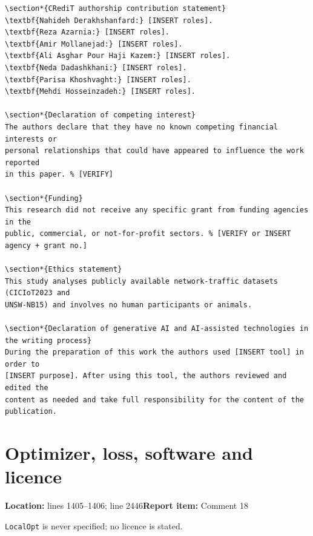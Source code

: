 \documentclass[10pt,a4paper]{article}
\newcommand{\issue}[3]{\section{#1}{\raggedright\noindent\textcolor{note}{\small\textbf{Location:} #2\quad\textbf{Report item:} #3}\par}\smallskip}
\newcommand{\why}[1]{\noindent\textcolor{note}{\small #1}\par\smallskip}
\begin{document}
\begin{after}
\begin{Verbatim}
\section*{CRediT authorship contribution statement}
\textbf{Nahideh Derakhshanfard:} [INSERT roles].
\textbf{Reza Azarnia:} [INSERT roles].
\textbf{Amir Mollanejad:} [INSERT roles].
\textbf{Ali Asghar Pour Haji Kazem:} [INSERT roles].
\textbf{Neda Dadashkhani:} [INSERT roles].
\textbf{Parisa Khoshvaght:} [INSERT roles].
\textbf{Mehdi Hosseinzadeh:} [INSERT roles].

\section*{Declaration of competing interest}
The authors declare that they have no known competing financial interests or
personal relationships that could have appeared to influence the work reported
in this paper. % [VERIFY]

\section*{Funding}
This research did not receive any specific grant from funding agencies in the
public, commercial, or not-for-profit sectors. % [VERIFY or INSERT agency + grant no.]

\section*{Ethics statement}
This study analyses publicly available network-traffic datasets (CICIoT2023 and
UNSW-NB15) and involves no human participants or animals.

\section*{Declaration of generative AI and AI-assisted technologies in the writing process}
During the preparation of this work the authors used [INSERT tool] in order to
[INSERT purpose]. After using this tool, the authors reviewed and edited the
content as needed and take full responsibility for the content of the publication.
\end{Verbatim}
\end{after}

\issue{Optimizer, loss, software and licence}{lines 1405--1406; line 2446}{Comment 18}
\why{\texttt{LocalOpt} is never specified; no licence is stated.}
\end{document}
